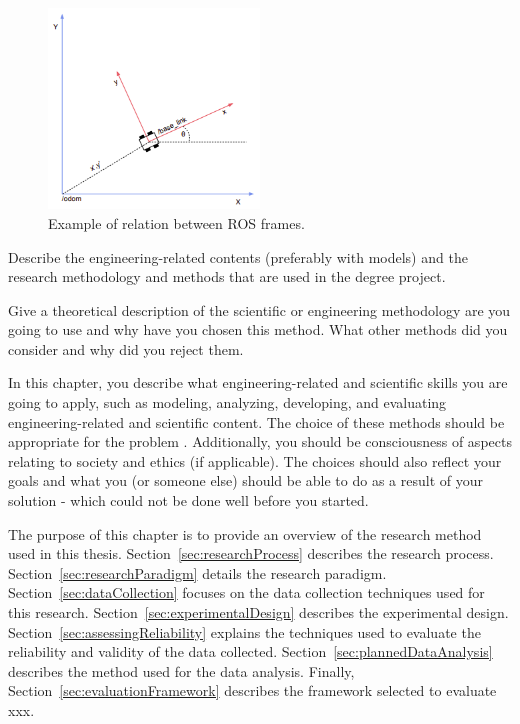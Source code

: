 \begin{figure}[!ht]
	\begin{center}
		\includegraphics[width=0.5\textwidth]{Images/2-Background/Frames-2021-04-22 12-03-22.png}
	\end{center}
	\caption{Example of relation between \Gls{ROS} frames.\cite{palsson_investigating_2017}}
	\label{fig:ros-frames}
\end{figure}

Describe the engineering-related contents (preferably with models) and the research methodology and methods that are used in the degree project.

Give a theoretical description of the scientific or engineering methodology are you going to use and why have you chosen this method. What other methods did you consider and why did you reject them.

In this chapter, you describe what engineering-related and scientific skills you are going to apply, such as modeling, analyzing, developing, and evaluating engineering-related and scientific content. The choice of these methods should be appropriate for the problem . Additionally, you should be consciousness of aspects relating to society and ethics (if applicable). The choices should also reflect your goals and what you (or someone else) should be able to do as a result of your solution - which could not be done well before you started.

The purpose of this chapter is to provide an overview of the research method
used in this thesis. Section~\ref{sec:researchProcess} describes the research
process. Section~\ref{sec:researchParadigm} details the research
paradigm. Section~\ref{sec:dataCollection} focuses on the data collection
techniques used for this research. Section~\ref{sec:experimentalDesign}
describes the experimental design. Section~\ref{sec:assessingReliability}
explains the techniques used to evaluate the reliability and validity of the
data collected. Section~\ref{sec:plannedDataAnalysis} describes the method
used for the data analysis. Finally, Section~\ref{sec:evaluationFramework}
describes the framework selected to evaluate xxx.


